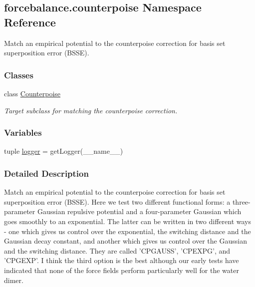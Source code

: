 \hypertarget{namespaceforcebalance_1_1counterpoise}{\subsection{forcebalance.\-counterpoise Namespace Reference}
\label{namespaceforcebalance_1_1counterpoise}
}


Match an empirical potential to the counterpoise correction for basis set superposition error (B\-S\-S\-E).  


\subsubsection*{Classes}
\begin{DoxyCompactItemize}
\item 
class \hyperlink{classforcebalance_1_1counterpoise_1_1Counterpoise}{Counterpoise}
\begin{DoxyCompactList}\small\item\em Target subclass for matching the counterpoise correction. \end{DoxyCompactList}\end{DoxyCompactItemize}
\subsubsection*{Variables}
\begin{DoxyCompactItemize}
\item 
tuple \hyperlink{namespaceforcebalance_1_1counterpoise_a9a7008a650c37185e7e43c9b1c943bd6}{logger} = get\-Logger(\-\_\-\-\_\-name\-\_\-\-\_\-)
\end{DoxyCompactItemize}


\subsubsection{Detailed Description}
Match an empirical potential to the counterpoise correction for basis set superposition error (B\-S\-S\-E). Here we test two different functional forms\-: a three-\/parameter Gaussian repulsive potential and a four-\/parameter Gaussian which goes smoothly to an exponential. The latter can be written in two different ways -\/ one which gives us control over the exponential, the switching distance and the Gaussian decay constant, and another which gives us control over the Gaussian and the switching distance. They are called 'C\-P\-G\-A\-U\-S\-S', 'C\-P\-E\-X\-P\-G', and 'C\-P\-G\-E\-X\-P'. I think the third option is the best although our early tests have indicated that none of the force fields perform particularly well for the water dimer.

